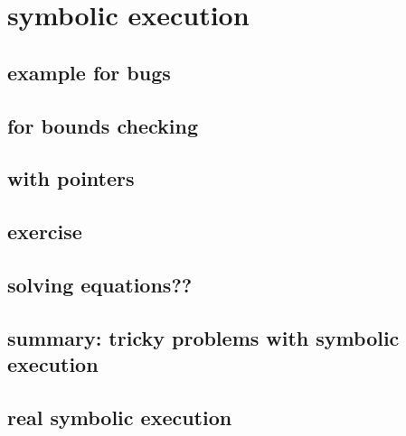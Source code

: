 \section{symbolic execution}



\subsection{example for bugs}



        

\subsection{for bounds checking}


\subsection{with pointers}


\subsection{exercise}


\subsection{solving equations??}

\subsection{summary: tricky problems with symbolic execution}


\subsection{real symbolic execution}


